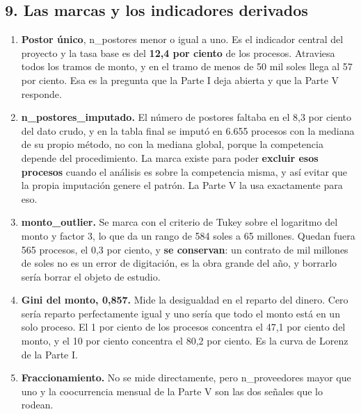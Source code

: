 \documentclass[11pt]{article}
\begin{document}
\subsection*{9. Las marcas y los indicadores derivados}
\begin{enumerate}
  \item \textbf{Postor único}, n\_\allowbreak{}postores menor o igual a uno. Es el indicador central del proyecto y la tasa base es del \textbf{12,4 por ciento} de los procesos. Atraviesa todos los tramos de monto, y en el tramo de menos de 50 mil soles llega al 57 por ciento. Esa es la pregunta que la Parte I deja abierta y que la Parte V responde.
  \item \textbf{n\_\allowbreak{}postores\_\allowbreak{}imputado.} El número de postores faltaba en el 8,3 por ciento del dato crudo, y en la tabla final se imputó en 6.655 procesos con la mediana de su propio método, no con la mediana global, porque la competencia depende del procedimiento. La marca existe para poder \textbf{excluir esos procesos} cuando el análisis es sobre la competencia misma, y así evitar que la propia imputación genere el patrón. La Parte V la usa exactamente para eso.
  \item \textbf{monto\_\allowbreak{}outlier.} Se marca con el criterio de Tukey sobre el logaritmo del monto y factor 3, lo que da un rango de 584 soles a 65 millones. Quedan fuera 565 procesos, el 0,3 por ciento, y \textbf{se conservan}: un contrato de mil millones de soles no es un error de digitación, es la obra grande del año, y borrarlo sería borrar el objeto de estudio.
  \item \textbf{Gini del monto, 0,857.} Mide la desigualdad en el reparto del dinero. Cero sería reparto perfectamente igual y uno sería que todo el monto está en un solo proceso. El 1 por ciento de los procesos concentra el 47,1 por ciento del monto, y el 10 por ciento concentra el 80,2 por ciento. Es la curva de Lorenz de la Parte I.
  \item \textbf{Fraccionamiento.} No se mide directamente, pero n\_\allowbreak{}proveedores mayor que uno y la coocurrencia mensual de la Parte V son las dos señales que lo rodean.
\end{enumerate}
\end{document}
